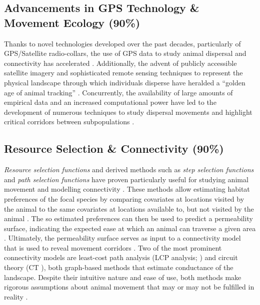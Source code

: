 \documentclass[abstract=on,10pt,a4paper,bibliography=totocnumbered]{article}
\begin{document}
\subsection{Advancements in GPS Technology \& Movement Ecology (90\%)}
Thanks to novel technologies developed over the past decades, particularly of
GPS/Satellite radio-collars, the use of GPS data to study animal dispersal and
connectivity has accelerated \citep{Elliot.2014, Jonsson.2016, Williams.2019}.
Additionally, the advent of publicly accessible satellite imagery and
sophisticated remote sensing techniques to represent the physical landscape
through which individuals disperse have heralded a ``golden age of animal
tracking'' \citep{Kays.2015}. Concurrently, the availability of large amounts of
empirical data and an increased computational power have led to the development
of numerous techniques to study dispersal movements and highlight critical
corridors between subpopulations \citep{Boyce.2002, Fortin.2005, Cushman.2010,
Zeller.2012, Diniz.2020}.

\subsection{Resource Selection \& Connectivity (90\%)}
\textit{Resource selection functions} \citep{Boyce.2002} and derived methods
such as \textit{step selection functions} \citep{Fortin.2005} and \textit{path
selection functions} \citep{Cushman.2010} have proven particularly useful for
studying animal movement \citep{Fieberg.2020} and modelling connectivity
\citep{Diniz.2020}. These methods allow estimating habitat preferences of the
focal species by comparing covariates at locations visited by the animal to the
same covariates at locations available to, but not visited by the animal
\citep{Boyce.2002, Fortin.2005, Cushman.2010, Thurfjell.2014}. The so estimated
preferences can then be used to predict a permeability surface, indicating the
expected ease at which an animal can traverse a given area \citep{Spear.2010,
Zeller.2012, Etherington.2016}. Ultimately, the permeability surface serves as
input to a connectivity model that is used to reveal movement corridors
\citep{Diniz.2020}. Two of the most prominent connectivity models are least-cost
path analysis (LCP analysis; \citealp{Adriaensen.2003}) and circuit theory (CT
\citealp{McRae.2006, McRae.2008}), both graph-based methods that estimate
conductance of the landscape. Despite their intuitive nature and ease of use,
both methods make rigorous assumptions about animal movement that may or may not
be fulfilled in reality \citep{Diniz.2020}.
\end{document}
